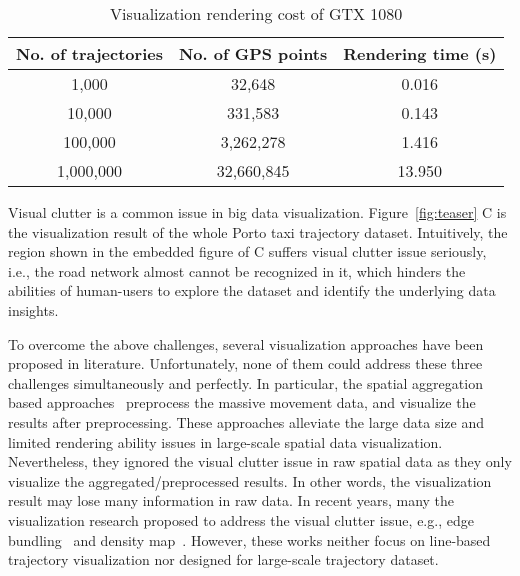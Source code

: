 \begin{table}
	\centering
    \small
	\caption{Visualization rendering cost of GTX 1080}
	\begin{tabular}{|c|c|c|} \hline
		No. of trajectories & No. of GPS points & Rendering time (s) \\ \hline
		1,000& 32,648 & 0.016\\ \hline
		10,000& 331,583 & 0.143\\ \hline
		100,000& 3,262,278 & 1.416\\ \hline
		1,000,000& 32,660,845 & 13.950\\
		\hline
	\end{tabular}
	\label{tab:gpu}
\end{table}

Visual clutter is a common issue in big data visualization.
Figure~\ref{fig:teaser} C is the visualization result of the whole Porto taxi trajectory dataset.
Intuitively, the region shown in the embedded figure of C suffers visual clutter issue seriously, 
i.e., the road network almost cannot be recognized in it,
which hinders the abilities of human-users to explore the dataset and identify the underlying data insights.



To overcome the above challenges, several visualization approaches have been proposed in literature.
Unfortunately, none of them could address these three challenges simultaneously and perfectly. 
In particular, the spatial aggregation based approaches~\cite{zeng2013visualizing,von2015mobilitygraphs} preprocess the massive movement data, and visualize the results after preprocessing. 
These approaches alleviate the large data size and limited rendering ability issues in large-scale spatial data visualization.
Nevertheless, they ignored the visual clutter issue in raw spatial data as they only visualize the aggregated/preprocessed results.
In other words, the visualization result may lose many information in raw data.
In recent years, many the visualization research proposed to address the visual clutter issue,
e.g., edge bundling~\cite{zeng2019route, thony2015vector} and density map~\cite{lampe2011interactive, scheepens2011interactive}. 
However, these works neither focus on line-based trajectory visualization nor designed for large-scale trajectory dataset.

